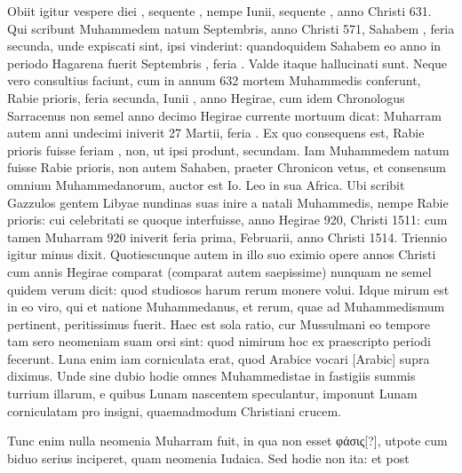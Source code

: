 Obiit igitur vespere diei ,
sequente , nempe  Iunii, sequente ,
 anno Christi 631.
Qui scribunt Muhammedem natum  Septembris, anno Christi
571, Sahabem , feria secunda, unde expiscati sint, ipsi vinderint:
quandoquidem  Sahabem eo anno in periodo Hagarena fuerit Septembris
, feria .
Valde itaque hallucinati sunt.
Neque vero
consultius faciunt, cum in annum 632 mortem Muhammedis conferunt,
 Rabie prioris, feria secunda, Iunii ,
 anno  Hegirae,
cum idem Chronologus Sarracenus non semel anno decimo Hegirae
currente mortuum dicat: Muharram autem anni undecimi iniverit
27 Martii, feria .
Ex quo consequens est,  Rabie prioris fuisse
feriam , non, ut ipsi produnt, secundam.
Iam Muhammedem
natum fuisse  Rabie prioris, non autem  Sahaben,
 praeter Chronicon
vetus, et consensum omnium Muhammedanorum, auctor est
Io.
Leo in sua Africa.
Ubi scribit Gazzulos gentem Libyae nundinas
suas inire a natali Muhammedis, nempe  Rabie prioris: cui celebritati
se quoque interfuisse, anno Hegirae 920, Christi 1511: cum
tamen Muharram 920 iniverit feria prima,  Februarii, anno
Christi 1514.
Triennio igitur minus dixit.
Quotiescunque autem in
illo suo eximio opere annos Christi cum annis Hegirae comparat (comparat
autem saepissime) nunquam ne semel quidem verum dicit:
quod studiosos harum rerum monere volui.
Idque mirum est in eo
viro, qui et natione Muhammedanus, et rerum, quae ad Muhammedismum
pertinent, peritissimus fuerit.
Haec est sola ratio, cur Mussulmani
eo tempore tam sero neomeniam suam orsi sint: quod nimirum
hoc ex praescripto periodi fecerunt.
Luna enim iam corniculata
erat, quod Arabice vocari \textarabic{}[Arabic] supra diximus.
Unde sine dubio hodie
omnes Muhammedistae in fastigiis summis turrium illarum, e quibus
Lunam nascentem speculantur, imponunt Lunam corniculatam
pro insigni, quaemadmodum
Christiani crucem.
%
\begin{table}[tp]

\end{table}
%
Tunc enim nulla neomenia
Muharram fuit, in qua
non esset \textgreek{φάσις[?]}, utpote cum
biduo serius inciperet,
quam neomenia Iudaica.
Sed hodie non ita: et post
